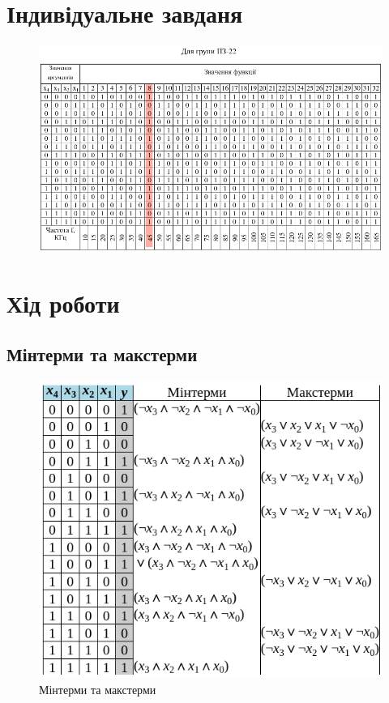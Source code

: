\documentclass{article}
\begin{document}
\begin{normalsize}
	\section*{Індивідуальне завданя}
	\begin{figure}[H]
		\centering
		\includegraphics[scale=0.8]{v}
	\end{figure}

	\section*{Хід роботи}
	\subsection*{Мінтерми та макстерми}
	\begin{figure}[H]
		\centering
		\includegraphics[scale=0.6]{2}
		\caption{Мінтерми та макстерми}
	\end{figure}


\end{normalsize}
\end{document}
